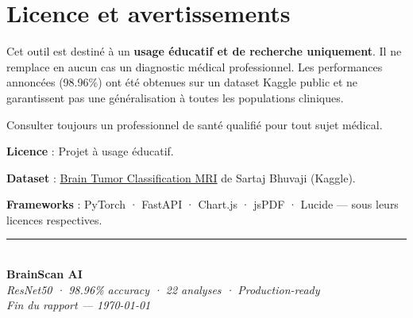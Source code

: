\documentclass[11pt,a4paper,oneside]{report}
\begin{document}
\section{Licence et avertissements}

\begin{warningbox}
Cet outil est destiné à un \textbf{usage éducatif et de recherche uniquement}. Il ne remplace en aucun cas un diagnostic médical professionnel. Les performances annoncées (98.96\%) ont été obtenues sur un dataset Kaggle public et ne garantissent pas une généralisation à toutes les populations cliniques.

Consulter toujours un professionnel de santé qualifié pour tout sujet médical.
\end{warningbox}

\textbf{Licence} : Projet à usage éducatif.

\textbf{Dataset} : \href{https://www.kaggle.com/datasets/sartajbhuvaji/brain-tumor-classification-mri}{Brain Tumor Classification MRI} de Sartaj Bhuvaji (Kaggle).

\textbf{Frameworks} : PyTorch · FastAPI · Chart.js · jsPDF · Lucide — sous leurs licences respectives.


\begin{center}
{\color{cyan}\rule{0.6\textwidth}{1pt}}\\[0.5cm]
{\large\bfseries\color{navy} BrainScan AI}\\
{\itshape\color{darkgray} ResNet50 · 98.96\% accuracy · 22 analyses · Production-ready}\\[0.3cm]
\textit{Fin du rapport — \today}
\end{center}
\end{document}

